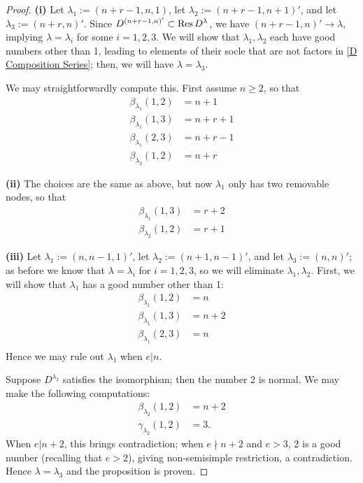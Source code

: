 \documentclass{amsart}
\begin{document}
\begin{proof}
  \textbf{(i)}
  Let $\lambda_1 := (n+r-1,n,1)$, let $\lambda_2 := (n+r-1,n+1)'$, and let $\lambda_3 := (n + r,n)'$.
  Since $D^{(n+r-1,n)'} \subset \text{Res} \, D^\lambda$, we have $(n + r - 1,n)' \longrightarrow \lambda$, implying $\lambda = \lambda_i$ for some $i = 1,2,3$.
  We will show that $\lambda_1,\lambda_2$ each have good numbers other than 1, leading to elements of their socle that are not factors in \eqref{D Composition Series};
  then, we will have $\lambda = \lambda_3$.

  We may straightforwardly compute this.
  First assume $n \geq 2$, so that
  \begin{align*}
    \beta_{\lambda_1}(1,2) &= n + 1\\
    \beta_{\lambda_1}(1,3) &= n + r + 1\\
    \beta_{\lambda_1}(2,3) &= n + r - 1\\
    \beta_{\lambda_2}(1,2) &= n + r
  \end{align*}

  \textbf{(ii)}
  The choices are the same as above, but now $\lambda_1$ only has two removable nodes, so that
  \begin{align*}
    \beta_{\lambda_1}(1,3) &= r + 2\\
    \beta_{\lambda_2}(1,2) &= r + 1
  \end{align*}

  \textbf{(iii)}
  Let $\lambda_1 := (n,n-1,1)'$, let $\lambda_2 := (n+1,n-1)'$, and let $\lambda_3 := (n,n)'$;
  as before we know that $\lambda = \lambda_i$ for $i = 1,2,3$, so we will eliminate $\lambda_1,\lambda_2$.
  First, we will show that $\lambda_1$ has a good number other than 1:
  \begin{align*}
    \beta_{\lambda_1}(1,2) &= n\\
    \beta_{\lambda_1}(1,3) &= n + 2\\
    \beta_{\lambda_1}(2,3) &= n\\
  \end{align*}
  Hence we may rule out $\lambda_1$ when $e | n$.


  Suppose $D^{\lambda_2}$ satisfies the isomorphism;
  then the number 2 is normal.
  We may make the following computations:
  \begin{align*}
    \beta_{\lambda_2}(1,2) &= n + 2\\
    \gamma_{\lambda_2}(1,2) &= 3.
  \end{align*}
  When $e | n + 2$, this brings contradiction;
  when $e \nmid n + 2$ and $e > 3$, 2 is a good number (recalling that $e > 2$), giving non-semisimple restriction, a contradiction.
  Hence $\lambda = \lambda_3$ and the proposition is proven.
\end{proof}
\fi
\end{document}
